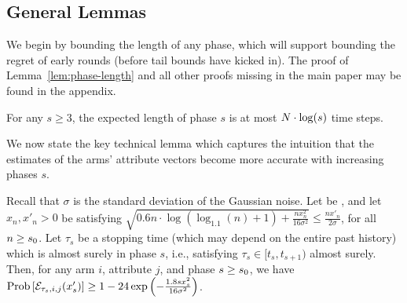 \subsection{General Lemmas}





We begin by bounding the length of any phase, which will support bounding
the regret of early rounds
(before tail bounds have kicked in). The proof of Lemma~\ref{lem:phase-length} and all other proofs missing in the main paper may be found in the appendix.
  
\begin{lemma} \label{lem:phase-length}
For any $s\geq 3$, the expected length of phase $s$ is at most
$N \cdot \log(s)$ time steps.
\end{lemma}
                  
We now state the key technical lemma which captures the intuition that
the estimates of the arms' attribute vectors become
more accurate with increasing phases $s$.

\begin{lemma} \label{lem:round-prob}
Recall that $\sigma$ is the standard deviation of the Gaussian noise.
Let \LatePhase be , 
and let $x_n, x'_n > 0$ be  satisfying 
$\sqrt{0.6 n \cdot \log (\log_{1.1}(n) + 1) + \frac{n x_n^2}{16 \sigma^2}}
\leq \frac{n x'_n}{2 \sigma}$,
for all $n \geq s_0$.
Let $\tau_s$ be a stopping time
(which may depend on the entire past history)
which is almost surely in phase $s$,
i.e., satisfying $\tau_s \in [t_s, t_{s+1})$ almost surely.
Then, for any arm $i$, attribute $j$, and phase $s \geq s_0$,
we have 
$\Prob{\AccE{\tau_s}{i}{j}{x'_s}}
\geq 1 - 24 \exp\left(-\frac{1.8 s x_s^2}{16 \sigma^2} \right)$.
\end{lemma}

